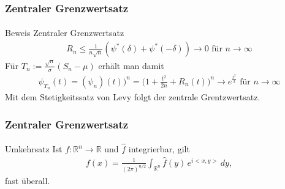 \documentclass{beamer}
\begin{document}
\begin{frame}
    \frametitle{Zentraler Grenzwertsatz}
\framesubtitle{}

\begin{block}{Beweis Zentraler Grenzwertsatz}
\begin{align*}
R_n \leq \frac{1}{n \sqrt{n}} (\psi^*(\delta)  + \psi^*(-\delta) ) \rightarrow 0  \text{ für } n \to \infty
\end{align*}
Für $T_n := \frac{\sqrt{n}}{\sigma}(S_n - \mu)$ erhält man damit
\begin{align*}
\psi_{T_n}(t) = (\psi_n)(t))^n = \biggl(  1 + \frac{t^2}{2n} + R_n(t) \biggr)^n \rightarrow e^{\frac{t^2}{2}} \text{ für } n \to \infty
\end{align*}
Mit dem Stetigkeitssatz von Levy folgt der zentrale Grentzwertsatz.
\end{block}


 \end{frame}



\begin{frame}
    \frametitle{Zentraler Grenzwertsatz}
\framesubtitle{}

\begin{block}{Umkehrsatz}
Ist $f: \mathbb{R}^n  \to  \mathbb{R}$ und $\hat{ f}$ integrierbar, gilt
\begin{align*}
f(x) = \frac{1}{\left(2\pi \right)^{n/2}} \int_{\mathbb{R}^n}\hat{ f}(y) \,e^{i  <x, y>} \, d y,
\end{align*}
fast überall.
\end{block}
 \end{frame}
\end{document}
